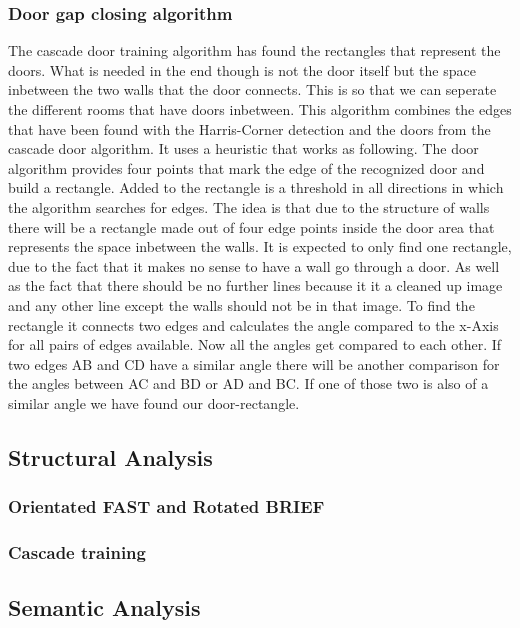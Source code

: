 \subsubsection{Door gap closing algorithm}

The cascade door training algorithm has found the rectangles that represent the doors. What is needed in the end though is not the door itself but the space inbetween the two walls that the door connects. This is so that we can seperate the different rooms that have doors inbetween.
This algorithm combines the edges that have been found with the Harris-Corner detection and the doors from the cascade door algorithm. It uses a heuristic that works as following. The door algorithm provides four points that mark the edge of the recognized door and build a rectangle.
Added to the rectangle is  a threshold in all directions in which the algorithm searches for edges. The idea is that due to the structure of walls there will be a rectangle made out of four edge points inside the door area that represents the space inbetween the walls. It is expected to only find one rectangle, due to the fact that it makes no sense to have a wall go through a door. As well as the fact that there should be no further lines because it it a cleaned up image and any other line except the walls should not be in that image.
To find the rectangle it connects two edges and calculates the angle compared to the x-Axis for all pairs of edges available. Now all the angles get compared to each other. If two edges AB and CD have a similar angle there will be another comparison for the angles between AC and BD or AD and BC. If one of those two is also of a similar angle we have found our door-rectangle.

\subsection{Structural Analysis}
\subsubsection{Orientated FAST and Rotated BRIEF}
\subsubsection{Cascade training}
\subsection{Semantic Analysis}
